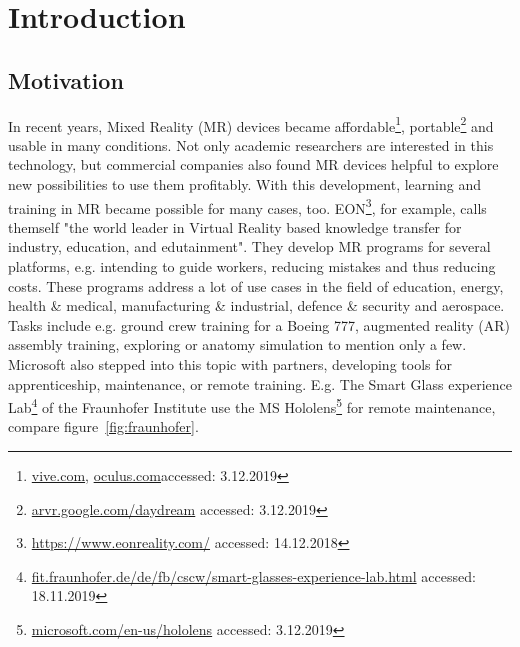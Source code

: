 \chapter{Introduction}

\section{Motivation}

In recent years, Mixed Reality (MR) devices became affordable\footnote{\hyperlink{https://www.vive.com/}{vive.com}, \hyperlink{https://www.oculus.com/}{oculus.com}accessed: 3.12.2019}, portable\footnote{\hyperlink{https://arvr.google.com/daydream/}{arvr.google.com/daydream} accessed: 3.12.2019} and usable in many conditions. Not only academic researchers are interested in this technology, but commercial companies also found MR devices helpful to explore new possibilities to use them profitably. With this development, learning and training in MR became possible for many cases, too. EON\footnote{\hyperlink{https://www.eonreality.com/}{https://www.eonreality.com/} accessed: 14.12.2018}, for example, calls themself "the world leader in Virtual Reality based knowledge transfer for industry, education, and edutainment". They develop MR programs for several platforms, e.g. intending to guide workers, reducing mistakes and thus reducing costs. These programs address a lot of use cases in the field of education, energy, health \& medical, manufacturing \& industrial, defence \& security and aerospace. Tasks include e.g. ground crew training for a Boeing 777, augmented reality (AR) assembly training, exploring or anatomy simulation to mention only a few.\\
Microsoft also stepped into this topic with partners, developing tools for apprenticeship, maintenance, or remote training. E.g. The Smart Glass experience Lab\footnote{\hyperlink{https://www.fit.fraunhofer.de/de/fb/cscw/smart-glasses-experience-lab.html}{fit.fraunhofer.de/de/fb/cscw/smart-glasses-experience-lab.html} accessed: 18.11.2019} of the Fraunhofer Institute use the MS Hololens\footnote{\hyperlink{https://www.microsoft.com/en-us/hololens}{microsoft.com/en-us/hololens} accessed: 3.12.2019} for remote maintenance, compare figure~\ref{fig:fraunhofer}.
